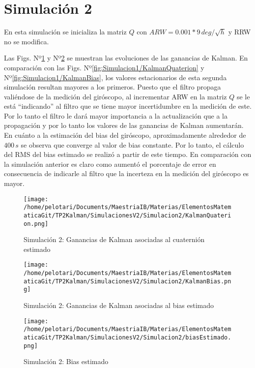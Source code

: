 \documentclass[a4paper,11pt,twoside]{IT-CNEA}
\begin{document}
\section{Simulación 2}
En esta simulación se inicializa la matriz $Q$ con $ARW=0.001*9\,deg/\sqrt{h}$ y RRW no se modifica. 
\par Las Figs. Nº\ref{fig:Simulacion2/KalmanQuaterion} y Nº\ref{fig:Simulacion2/KalmanBias} se muestran las evoluciones de las ganancias de Kalman. En comparación con las Figs. Nº\ref{fig:Simulacion1/KalmanQuaterion} y Nº\ref{fig:Simulacion1/KalmanBias}, los valores estacionarios de esta segunda simulación resultan mayores a los primeros. Puesto que el filtro propaga valiéndose de la medición del giróscopo, al incrementar ARW en la matriz $Q$ se le está ``indicando'' al filtro que se tiene mayor incertidumbre en la medición de este. Por lo tanto el filtro le dará mayor importancia a la actualización que a la propagación y por lo tanto los valores de las ganancias de Kalman aumentarán. 
\\ En cuánto a la estimación del bias del giróscopo, aproximadamente alrededor de $400\,s$ se observa que converge al valor de bias constante. Por lo tanto, el cálculo del RMS del bias estimado se realizó a partir de este tiempo. En comparación con la simulación anterior es claro como aumentó el porcentaje de error en consecuencia de indicarle al filtro que la incerteza en la medición del giróscopo es mayor. 
\begin{figure}[h!]
\centering
\texttt{[image: /home/pelotari/Documents/MaestriaIB/Materias/ElementosMatematicaGit/TP2Kalman/SimulacionesV2/Simulacion2/KalmanQuaterion.png]}
\caption{Simulación 2:  Ganancias de Kalman asociadas al cuaternión estimado}
\label{fig:Simulacion2/KalmanQuaterion}
\end{figure}
\begin{figure}[h!]
\centering
\texttt{[image: /home/pelotari/Documents/MaestriaIB/Materias/ElementosMatematicaGit/TP2Kalman/SimulacionesV2/Simulacion2/KalmanBias.png]}
\caption{Simulación 2:  Ganancias de Kalman asociadas al bias estimado}
\label{fig:Simulacion2/KalmanBias}
\end{figure}
\begin{figure}[h!]
\centering
\texttt{[image: /home/pelotari/Documents/MaestriaIB/Materias/ElementosMatematicaGit/TP2Kalman/SimulacionesV2/Simulacion2/biasEstimado.png]}
\caption{Simulación 2:  Bias estimado}
\label{fig:Simulacion2/biasEstimado}
\end{figure}
\end{document}
